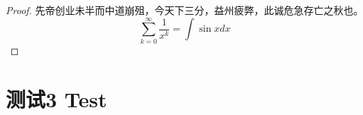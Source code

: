 \documentclass[oneside]{../source/fduthesis}
\newtheorem*{proof}{证明}
\theoremstyle{plain}
\begin{document}
\begin{proof}
先帝创业未半而中道崩殂，今天下三分，益州疲弊，此诚危急存亡之秋也。
\begin{equation}
	\sum_{k=0}^{\infty} \frac{1}{x^k} = \int \sin x dx
\end{equation}
\end{proof}
\chapter{测试3 Test}
%
\end{document}
